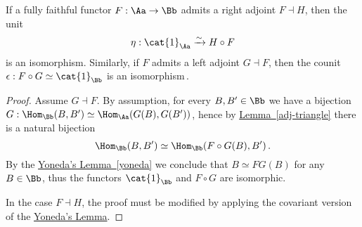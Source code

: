 \begin{cor}\label{ff-adj}
    If a fully faithful functor $F:\Aa \to \Bb$ admits a right adjoint
    $F \dashv H$, then the unit
    \begin{equation*}
        \eta : \cat{1}_{\Aa} \xrightarrow[]{\sim} H \circ F
    \end{equation*}
    is an isomorphism.
    Similarly, if $F$ admits a left adjoint $G \dashv F$, then the
    counit $\epsilon : F \circ G \simeq \cat{1}_{\Bb}$ is an isomorphism\,.
    \begin{proof}
        Assume $G \dashv F$.
        By assumption, for every $B,B' \in \Bb$ we have
        a bijection $G : \Hom_{\Bb}(B,B') \simeq \Hom_{\Aa}(G(B),G(B'))$,
        hence by \hyperref[adj-triangle]{Lemma~\ref*{adj-triangle}}
        there is a natural bijection
        \begin{equation*}
            \Hom_{\Bb}(B,B') \simeq \Hom_{\Bb}(F \circ G(B),B')\,.
        \end{equation*}
        By the \hyperref[yoneda]{Yoneda's Lemma~\ref*{yoneda}} we conclude
        that $B \simeq FG(B)$ for any $B \in \Bb$, thus the functors $\cat{1}_{\Bb}$
        and $F \circ G$ are isomorphic.

        In the case $F \dashv H$, the proof must be modified
        by applying the covariant version of the 
        \hyperref[yoneda]{Yoneda's Lemma}.
    \end{proof}
\end{cor}

